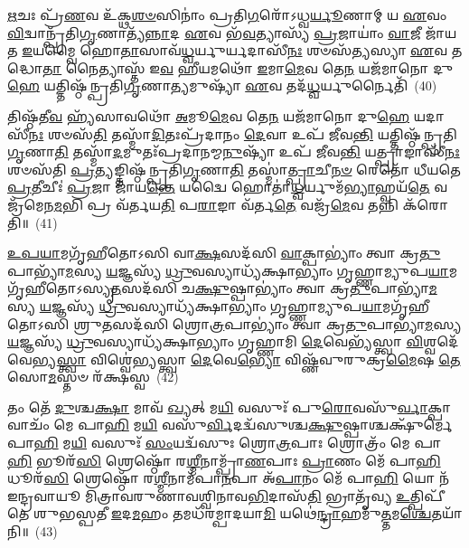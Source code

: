 \-\ul{𑌋}\-𑌚𑌃 𑌪𑍍𑌰᳴\-\ul{𑌣}\-𑌵 𑌉᳴𑌕𑍍𑌥\-\ul{𑌶}\-\-\ul{𑍞}\-𑌸𑌿𑌨𑌾𑌂॑ 𑌪𑍍𑌰𑌤𑌿\-\ul{𑌗}\-𑌰𑍋᳴\-𑌽𑌧𑍍𑌵\-\ul{𑌰𑍍𑌯𑍂}\-𑌣𑌾𑌮𑍍 𑌯 \ul{𑌏}\-𑌵𑌂 \ul{𑌵𑌿}\-𑌦𑍍𑌵𑌾𑌨𑍍𑌪𑍍𑌰᳴𑌤𑌿\-\ul{𑌗𑍃}\-𑌣𑌾𑌤𑍍𑌯᳴\-\ul{𑌨𑍍𑌨𑌾}\-𑌦 \ul{𑌏}\-𑌵 𑌭᳴\-\ul{𑌵}\-𑌤𑍍𑌯𑌾𑌸𑍍𑌯᳴ \ul{𑌪𑍍𑌰}\-𑌜𑌾𑌯𑌾𑌂॑ \ul{𑌵𑌾}\-𑌜𑍀 𑌜𑌾᳴𑌯𑌤 \ul{𑌇}\-𑌯𑌮𑍍𑌵𑍈 𑌹𑍋\-\ul{𑌤𑌾}\-𑌸𑌾𑌵᳴\-\ul{𑌧𑍍𑌵}\-𑌰𑍍𑌯𑍁𑌰𑍍𑌯𑌦𑌾𑌸𑍀᳴\-\ul{𑌨𑌃} 𑌶𑍞𑌸᳴\-\ul{𑌤𑍍𑌯}\-𑌸𑍍𑌯𑌾 \ul{𑌏}\-𑌵 𑌤𑌦𑍍𑌧𑍋\-\ul{𑌤𑌾} 𑌨𑍈𑌤𑍍𑌯𑌾𑌸𑍍𑌤᳴ 𑌇\-\ul{𑌵} 𑌹𑍀𑌯𑌮𑌥𑍋᳴ \ul{𑌇}\-𑌮𑌾\-\ul{𑌮𑍇}\-𑌵 𑌤𑍇\-\ul{𑌨} 𑌯𑌜᳴𑌮𑌾𑌨𑍋 𑌦𑍁\-\ul{𑌹𑍇} 𑌯𑌤𑍍𑌤𑌿𑌷𑍍𑌠᳴𑌨𑍍𑌪𑍍𑌰𑌤𑌿\-\ul{𑌗𑍃}\-𑌣𑌾\-\ul{𑌤𑍍𑌯}\-𑌮𑍁𑌷𑍍𑌯𑌾᳴ \ul{𑌏}\-𑌵 𑌤𑌦᳴\-\ul{𑌧𑍍𑌵}\-𑌰𑍍𑌯𑍁𑌰𑍍𑌨𑍈𑌤𑌿᳴~(40)

𑌤𑌿𑌷𑍍𑌠᳴𑌤𑍀\-\ul{𑌵} 𑌹𑍍𑌯᳴𑌸𑌾𑌵𑌥𑍋᳴ \ul{𑌅}\-𑌮𑍂\-\ul{𑌮𑍇}\-𑌵 𑌤𑍇\-\ul{𑌨} 𑌯𑌜᳴𑌮𑌾𑌨𑍋 𑌦𑍁\-\ul{𑌹𑍇} 𑌯𑌦𑌾𑌸𑍀᳴\-\ul{𑌨𑌃} 𑌶𑍞𑌸᳴\-\ul{𑌤𑌿} 𑌤𑌸𑍍𑌮𑌾᳴\-\ul{𑌦𑌿}\-𑌤𑌃𑌪𑍍𑌰᳴𑌦𑌾𑌨𑌂 \ul{𑌦𑍇}\-𑌵𑌾 𑌉𑌪᳴ 𑌜𑍀𑌵\-\ul{𑌨𑍍𑌤𑌿} 𑌯𑌤𑍍𑌤𑌿𑌷𑍍𑌠᳴𑌨𑍍𑌪𑍍𑌰𑌤𑌿\-\ul{𑌗𑍃}\-𑌣𑌾\-\ul{𑌤𑌿} 𑌤𑌸𑍍𑌮𑌾᳴\-\ul{𑌦}\-𑌮𑍁𑌤𑌃᳴𑌪𑍍𑌰𑌦𑌾𑌨𑌮𑍍𑌮\-\ul{𑌨𑍁}\-𑌷𑍍𑌯𑌾᳴ 𑌉𑌪᳴ 𑌜𑍀𑌵\-\ul{𑌨𑍍𑌤𑌿} 𑌯𑌤𑍍𑌪𑍍𑌰𑌾𑌙𑌾𑌸𑍀᳴\-\ul{𑌨𑌃} 𑌶𑍞𑌸᳴𑌤𑌿 \ul{𑌪𑍍𑌰}\-𑌤𑍍𑌯𑌙𑍍𑌤𑌿𑌷𑍍𑌠᳴𑌨𑍍𑌪𑍍𑌰𑌤𑌿\-\ul{𑌗𑍃}\-𑌣𑌾\-\ul{𑌤𑌿} 𑌤𑌸𑍍𑌮𑌾॑\-\ul{𑌤𑍍𑌪𑍍𑌰𑌾}\-𑌚𑍀\-\ul{𑌨}\-\-\ul{𑍞} 𑌰𑍇𑌤𑍋᳴ 𑌧𑍀𑌯𑌤𑍇 \ul{𑌪𑍍𑌰}\-𑌤𑍀𑌚𑍀𑌃॑ \ul{𑌪𑍍𑌰}\-𑌜𑌾 𑌜𑌾᳴𑌯\-\ul{𑌨𑍍𑌤𑍇} 𑌯𑌦𑍍𑌵𑍈 𑌹𑍋𑌤𑌾॑\-\ul{𑌧𑍍𑌵}\-𑌰𑍍𑌯𑍁𑌮᳴\-\ul{𑌭𑍍𑌯𑌾}\-𑌹𑍍𑌵𑌯᳴\-\ul{𑌤𑍇} 𑌵𑌜𑍍𑌰᳴𑌮𑍇𑌨\-\ul{𑌮}\-𑌭𑌿 𑌪𑍍𑌰 𑌵᳴𑌰𑍍𑌤𑌯\-\ul{𑌤𑌿} 𑌪\-\ul{𑌰𑌾}\-𑌙𑌾 𑌵᳴𑌰𑍍𑌤\-\ul{𑌤𑍇} 𑌵𑌜𑍍𑌰᳴\-\ul{𑌮𑍇}\-𑌵 𑌤𑌨𑍍𑌨𑌿 𑌕᳴𑌰𑍋𑌤𑌿॥~(41)

{\anuvakamend[{𑌸𑌵᳴\-\ul{𑌨𑍇} 𑌵𑌜𑍍𑌰᳴\-\ul{𑌮}\-𑌨𑍍𑌤𑌰𑍍𑌧᳴\-\ul{𑌤𑍍𑌤𑍇} 𑌤𑍍𑌰𑍀\-\ul{𑌣𑍍𑌯𑍇}\-𑌤𑌾\-\ul{𑌨𑍍𑌯}\-𑌕𑍍𑌷𑌰𑌾᳴𑌣𑍀\-\ul{𑌨𑍍𑌦𑍍𑌰𑌿}\-𑌯𑌮𑍍𑌮𑌾𑌧𑍍𑌯᳴𑌨𑍍𑌦𑌿\-\ul{𑌨}\-\-\ul{𑍞} 𑌸𑌵᳴\-\ul{𑌨}\-𑌨𑍍𑌨𑍋𑌦𑍍𑌗𑌾᳴\-\ul{𑌤𑍃}\-𑌣𑌾𑌮᳴\-\ul{𑌧𑍍𑌵}\-𑌰𑍍𑌯𑍁𑌰𑍍𑌨𑍈𑌤𑌿᳴ 𑌵𑌰𑍍𑌤𑌯\-\ul{𑌤𑍍𑌯}\-𑌷𑍍𑌟𑍗 𑌚᳴}]}%

\-\ul{𑌉}\-\-\ul{𑌪}\-\-\ul{𑌯𑌾}\-𑌮𑌗𑍃᳴𑌹𑍀𑌤𑍋\-𑌽𑌸𑌿 𑌵𑌾\-\ul{𑌕𑍍𑌷}\-𑌸𑌦᳴𑌸𑌿 \ul{𑌵𑌾}\-𑌕𑍍𑌪𑌾\-𑌭𑍍𑌯𑌾𑌂॑ 𑌤𑍍𑌵𑌾 𑌕𑍍𑌰\-\ul{𑌤𑍁}\-𑌪𑌾𑌭𑍍𑌯𑌾᳴\-\ul{𑌮}\-𑌸𑍍𑌯 \ul{𑌯}\-𑌜𑍍𑌞𑌸𑍍𑌯᳴ \ul{𑌧𑍍𑌰𑍁}\-𑌵𑌸𑍍𑌯𑌾𑌧𑍍𑌯᳴𑌕𑍍𑌷𑌾𑌭𑍍𑌯𑌾𑌂 𑌗𑍃𑌹𑍍𑌣𑌾𑌮𑍍𑌯𑍁𑌪\-\ul{𑌯𑌾}\-𑌮𑌗𑍃᳴𑌹𑍀𑌤𑍋\-𑌽𑌸𑍍𑌯𑍃\-\ul{𑌤}\-𑌸𑌦᳴𑌸𑌿 𑌚\-\ul{𑌕𑍍𑌷𑍁}\-𑌷𑍍𑌪𑌾\-𑌭𑍍𑌯𑌾𑌂॑ 𑌤𑍍𑌵𑌾 𑌕𑍍𑌰\-\ul{𑌤𑍁}\-𑌪𑌾𑌭𑍍𑌯𑌾᳴\-\ul{𑌮}\-𑌸𑍍𑌯 \ul{𑌯}\-𑌜𑍍𑌞𑌸𑍍𑌯᳴ \ul{𑌧𑍍𑌰𑍁}\-𑌵𑌸𑍍𑌯𑌾𑌧𑍍𑌯᳴𑌕𑍍𑌷𑌾𑌭𑍍𑌯𑌾𑌂 𑌗𑍃𑌹𑍍𑌣𑌾𑌮𑍍𑌯𑍁𑌪\-\ul{𑌯𑌾}\-𑌮𑌗𑍃᳴𑌹𑍀𑌤𑍋\-𑌽𑌸𑌿 𑌶𑍍𑌰𑍁\-\ul{𑌤}\-𑌸𑌦᳴𑌸𑌿 𑌶𑍍𑌰𑍋\-\ul{𑌤𑍍𑌰}\-𑌪𑌾\-𑌭𑍍𑌯𑌾𑌂॑ 𑌤𑍍𑌵𑌾 𑌕𑍍𑌰\-\ul{𑌤𑍁}\-𑌪𑌾𑌭𑍍𑌯𑌾᳴\-\ul{𑌮}\-𑌸𑍍𑌯 \ul{𑌯}\-𑌜𑍍𑌞𑌸𑍍𑌯᳴ \ul{𑌧𑍍𑌰𑍁}\-𑌵𑌸𑍍𑌯𑌾𑌧𑍍𑌯᳴𑌕𑍍𑌷𑌾𑌭𑍍𑌯𑌾𑌂 𑌗𑍃𑌹𑍍𑌣𑌾𑌮𑌿 \ul{𑌦𑍇}\-𑌵𑍇𑌭𑍍𑌯᳴𑌸𑍍𑌤𑍍𑌵𑌾 \ul{𑌵𑌿}\-𑌶𑍍𑌵𑌦𑍇᳴𑌵𑍇𑌭𑍍𑌯\-\ul{𑌸𑍍𑌤𑍍𑌵𑌾} 𑌵𑌿𑌶𑍍𑌵𑍇॑𑌭𑍍𑌯𑌸𑍍𑌤𑍍𑌵𑌾 \ul{𑌦𑍇}\-𑌵𑍇\-\ul{𑌭𑍍𑌯𑍋} 𑌵𑌿𑌷𑍍𑌣᳴𑌵𑍁𑌰𑍁𑌕𑍍𑌰\-\ul{𑌮𑍈}\-𑌷 \ul{𑌤𑍇} 𑌸𑍋\-\ul{𑌮}\-𑌸𑍍𑌤𑍞 𑌰᳴𑌕𑍍𑌷𑌸𑍍𑌵~(42)

𑌤𑌂 𑌤𑍇᳴ \ul{𑌦𑍁}\-𑌶𑍍𑌚\-\ul{𑌕𑍍𑌷𑌾} 𑌮𑌾𑌵᳴ \ul{𑌖𑍍𑌯}\-𑌤𑍍 𑌮\-\ul{𑌯𑌿} 𑌵𑌸𑍁𑌃᳴ 𑌪𑍁\-\ul{𑌰𑍋}\-𑌵𑌸𑍁᳴\-\ul{𑌰𑍍𑌵𑌾}\-𑌕𑍍𑌪𑌾 𑌵𑌾𑌚𑌂᳴ 𑌮𑍇 𑌪𑌾\-\ul{𑌹𑌿} 𑌮\-\ul{𑌯𑌿} 𑌵𑌸𑍁᳴\-\ul{𑌰𑍍𑌵𑌿}\-𑌦𑌦𑍍𑌵᳴𑌸𑍁𑌶𑍍𑌚\-\ul{𑌕𑍍𑌷𑍁}\-𑌷𑍍𑌪𑌾𑌶𑍍𑌚𑌕𑍍𑌷𑍁᳴𑌰𑍍𑌮𑍇 𑌪𑌾\-\ul{𑌹𑌿} 𑌮\-\ul{𑌯𑌿} 𑌵𑌸𑍁𑌃᳴ \ul{𑌸𑌂}\-𑌯𑌦𑍍𑌵᳴𑌸𑍁𑌃 𑌶𑍍𑌰𑍋\-\ul{𑌤𑍍𑌰}\-𑌪𑌾𑌃 𑌶𑍍𑌰𑍋𑌤𑍍𑌰𑌂᳴ 𑌮𑍇 𑌪𑌾\-\ul{𑌹𑌿} 𑌭𑍂𑌰᳴\-\ul{𑌸𑌿} 𑌶𑍍𑌰𑍇𑌷𑍍𑌠𑍋᳴ 𑌰\-\ul{𑌶𑍍𑌮𑍀}\-𑌨𑌾𑌮𑍍𑌪𑍍𑌰𑌾᳴\-\ul{𑌣}\-𑌪𑌾𑌃 \ul{𑌪𑍍𑌰𑌾}\-𑌣𑌂 𑌮𑍇᳴ 𑌪𑌾\-\ul{𑌹𑌿} 𑌧𑍂𑌰᳴\-\ul{𑌸𑌿} 𑌶𑍍𑌰𑍇𑌷𑍍𑌠𑍋᳴ 𑌰\-\ul{𑌶𑍍𑌮𑍀}\-𑌨𑌾𑌮᳴𑌪𑌾\-\ul{𑌨}\-𑌪𑌾 𑌅᳴\-\ul{𑌪𑌾}\-𑌨𑌂 𑌮𑍇᳴ 𑌪𑌾\-\ul{𑌹𑌿} 𑌯𑍋 𑌨᳴ 𑌇𑌨𑍍𑌦𑍍𑌰𑌵𑌾𑌯𑍂 𑌮𑌿𑌤𑍍𑌰𑌾𑌵𑌰𑍁𑌣𑌾𑌵𑌶𑍍𑌵𑌿𑌨𑌾𑌵\-\ul{𑌭𑌿}\-𑌦𑌾𑌸᳴\-\ul{𑌤𑌿} 𑌭𑍍𑌰𑌾𑌤𑍃᳴𑌵𑍍𑌯 \ul{𑌉}\-𑌤𑍍𑌪𑌿𑌪𑍀᳴𑌤𑍇 𑌶𑍁𑌭𑌸𑍍𑌪𑌤𑍀 \ul{𑌇}\-𑌦\-\ul{𑌮}\-𑌹𑌂 𑌤𑌮𑌧᳴𑌰𑌮𑍍𑌪𑌾𑌦𑌯𑌾\-\ul{𑌮𑌿} 𑌯𑌥𑍇॑\-\ul{𑌨𑍍𑌦𑍍𑌰𑌾}\-𑌹𑌮𑍁᳴\-\ul{𑌤𑍍𑌤}\-𑌮\-\ul{𑌶𑍍𑌚𑍇}\-𑌤𑌯𑌾᳴𑌨𑌿॥~(43)

